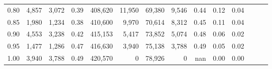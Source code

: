 \begin{tabular}{rrrrrrrrrrrrrr}
0.80 &   4,857 &   3,072 &  0.39 &  408,620 &   11,950 &  69,380 &   9,546 &  0.44 &  0.12 &      0.04 \\
0.85 &   1,980 &   1,234 &  0.38 &  410,600 &    9,970 &  70,614 &   8,312 &  0.45 &  0.11 &      0.04 \\
0.90 &   4,553 &   3,238 &  0.42 &  415,153 &    5,417 &  73,852 &   5,074 &  0.48 &  0.06 &      0.02 \\
0.95 &   1,477 &   1,286 &  0.47 &  416,630 &    3,940 &  75,138 &   3,788 &  0.49 &  0.05 &      0.02 \\
1.00 &   3,940 &   3,788 &  0.49 &  420,570 &        0 &  78,926 &       0 &   nan &  0.00 &      0.00 \\
\bottomrule
\end{tabular}
